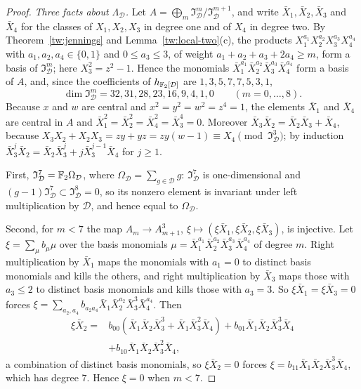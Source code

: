 \begin{proof}
\emph{Three facts about $\Lambda_{\mathcal D}$.} Let $A=\bigoplus_m\mathfrak I_{\mathcal D}^m/\mathfrak I_{\mathcal D}^{m+1}$,
and write $\bar X_1,\bar X_2,\bar X_3$ and $\bar X_4$ for the classes of $X_1,X_2,X_3$ in degree one and
of $X_4$ in degree two. By Theorem~\ref{tw:jennings} and
Lemma~\ref{tw:local-two}(c), the products
$X_1^{a_1}X_2^{a_2}X_3^{a_3}X_4^{a_4}$ with $a_1,a_2,a_4\in\{0,1\}$ and
$0\le a_3\le3$, of weight $a_1+a_2+a_3+2a_4\ge m$, form a basis of
$\mathfrak I_{\mathcal D}^m$; here $X_3^2=z^2-1$. Hence the monomials
$\bar X_1^{a_1}\bar X_2^{a_2}\bar X_3^{a_3}\bar X_4^{a_4}$ form a basis of $A$, and, since the
coefficients of $h_{\mathbb F_2[\mathcal D]}$ are $1,3,5,7,7,5,3,1$,
\[
 \dim\mathfrak I_{\mathcal D}^m=32,31,28,23,16,9,4,1,0\qquad(m=0,\dots,8).
\]
Because $x$ and $w$ are central and $x^2=y^2=w^2=z^4=1$, the elements $\bar X_1$
and $\bar X_4$ are central in $A$ and $\bar X_1^2=\bar X_2^2=\bar X_4^2=\bar X_3^4=0$. Moreover $\bar X_3\bar X_2=\bar X_2\bar X_3+\bar X_4$,
because $X_3X_2+X_2X_3=zy+yz=zy(w-1)\equiv X_4\pmod{\mathfrak I_{\mathcal D}^3}$; by
induction $\bar X_3^j\bar X_2=\bar X_2\bar X_3^j+j\bar X_3^{j-1}\bar X_4$ for $j\ge1$.

First, $\mathfrak I_{\mathcal D}^7=\mathbb F_2\Omega_{\mathcal D}$, where $\Omega_{\mathcal D}=\sum_{g\in \mathcal D}g$:
$\mathfrak I_{\mathcal D}^7$ is one-dimensional and $(g-1)\mathfrak I_{\mathcal D}^7\subset\mathfrak I_{\mathcal D}^8=0$,
so its nonzero element is invariant under left multiplication by $\mathcal D$, and
hence equal to $\Omega_{\mathcal D}$.

Second, for $m<7$ the map $A_m\to A_{m+1}^3$, $\xi\mapsto(\xi\bar X_1,\xi\bar X_2,\xi\bar X_3)$,
is injective. Let $\xi=\sum_\mu b_\mu\mu$ over the basis monomials
$\mu=\bar X_1^{a_1}\bar X_2^{a_2}\bar X_3^{a_3}\bar X_4^{a_4}$ of degree $m$. Right multiplication by $\bar X_1$
maps the monomials with $a_1=0$ to distinct basis monomials and kills the
others, and right multiplication by $\bar X_3$ maps those with $a_3\le2$ to
distinct basis monomials and kills those with $a_3=3$. So $\xi\bar X_1=\xi\bar X_3=0$
forces $\xi=\sum_{a_2,a_4}b_{a_2a_4}\bar X_1\bar X_2^{a_2}\bar X_3^3\bar X_4^{a_4}$. Then
\begin{align*}
 \xi\bar X_2={}&b_{00}(\bar X_1\bar X_2\bar X_3^3+\bar X_1\bar X_3^2\bar X_4)
 +b_{01}\bar X_1\bar X_2\bar X_3^3\bar X_4\\
 &+b_{10}\bar X_1\bar X_2\bar X_3^2\bar X_4,
\end{align*}
a combination of distinct basis monomials, so $\xi\bar X_2=0$ forces
$\xi=b_{11}\bar X_1\bar X_2\bar X_3^3\bar X_4$, which has degree $7$. Hence $\xi=0$ when $m<7$.


\end{proof}
